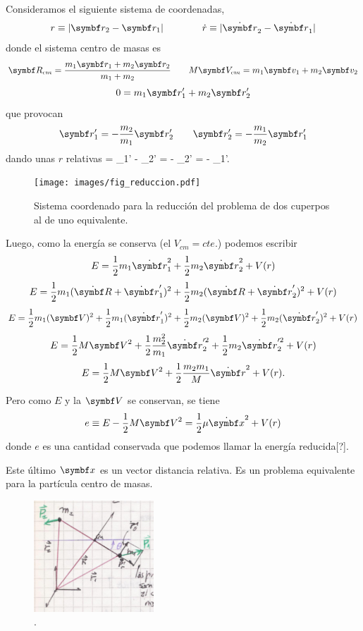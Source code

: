 \documentclass[10pt,oneside]{CBFT_book}
\begin{document}
Consideramos el siguiente sistema de coordenadas,
\[
	r \equiv | \vb{r}_2 - \vb{r}_1 | \qquad	\qquad  \dot{r} \equiv | \dot{\vb{r}}_2 - \dot{\vb{r}}_1 |
\]
donde el sistema centro de masas es
\[
	\vb{R}_{cm} = \frac{ m_1\vb{r}_1 + m_2\vb{r}_2 }{ m_1 + m_2 }	\qquad 
	M \vb{V}_{cm} =  m_1\vb{v}_1 + m_2\vb{v}_2 
\]
\[
	0 = m_1\vb{r}_1' + m_2\vb{r}_2'
\]
que provocan
\[
	\vb{r}_1' = -\frac{m_2}{m_1}\vb{r}_2' \qquad   \vb{r}_2' = -\frac{m_1}{m_2}\vb{r}_1' 
\]
dando unas $r$ relativas
\be
	 = _1' - _2' = - _2' = - _1'.
	\label{r_relativas}
\ee

\begin{figure}[hbt]
	\begin{center}
	\texttt{[image: images/fig\_reduccion.pdf]}	 
	\end{center}
	\caption{Sistema coordenado para la reducción del problema de dos cuperpos al de uno equivalente.}
\end{figure} 

Luego, como la energía se conserva (el $V_{cm}=cte.$) podemos escribir
\[
	E = \frac{1}{2} m_1 \dot{\vb{r}}_1^2 + \frac{1}{2} m_2 \dot{\vb{r}}_2^2 + V(r)
\]
\[
	E = \frac{1}{2} m_1 ( \dot{\vb{R}} + \dot{\vb{r}}_1' )^2 + \frac{1}{2} m_2 ( \dot{\vb{R}} + \dot{\vb{r}}_2' )^2 
+ V(r)
\]
\[
	E = \frac{1}{2} m_1 ( {\vb{V}} )^2 +  \frac{1}{2} m_1 ( \dot{\vb{r}}_1' )^2 + 
		\frac{1}{2} m_2 ( {\vb{V}})^2 + \frac{1}{2} m_2 (\dot{\vb{r}}_2' )^2 + V(r)
\]
\[
	E = \frac{1}{2} M {\vb{V}}^2 + \frac{1}{2} \frac{m_2^2}{m_1} \dot{\vb{r}}_2'^2 + \frac{1}{2} m_2 
\dot{\vb{r}}_2'^2 + V(r)
\]
\[
	E = \frac{1}{2} M {\vb{V}}^2 + \frac{1}{2} \frac{m_2 m_1}{M} \dot{\vb{r}}^2 + V(r).
\]

Pero como $E$ y la $\vb{V}$ se conservan, se tiene 
\[
	e \equiv E - \frac{1}{2} M {\vb{V}}^2 =  \frac{1}{2} \mu \dot{\vb{x}}^2 + V(r)
\]
donde $e$ es una cantidad conservada que podemos llamar la energía reducida[?].

Este último $\vb{x}$ es un vector distancia relativa. Es un problema equivalente para la partícula
centro de masas.

\begin{figure}[hbt]
	\begin{center}
	\includegraphics[width=0.4\textwidth]{images/fig_mc_prob_equiv.pdf}	 
	\end{center}
	\caption{.}
	\label{fig_mc_prob_equiv}
\end{figure} 
\end{document}
